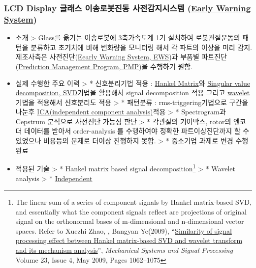 \documentclass[]{article}
\begin{document}
\subsubsection{LCD Display 글래스 이송로봇진동 사전감지시스템 (\href{https://en.wikipedia.org/wiki/Early_warning_system}{Early Warning System})}

\begin{itemize}
\item
  소개 \textgreater{} Glass를 옮기는 이송로봇에 3축가속도계 1기 설치하여
  로봇관절운동의 패턴을 분류하고 초기치에 비해 변화량을 모니터링 해서 각
  파트의 이상을 미리 감지. 제조사측은
  사전진단(\href{https://en.wikipedia.org/wiki/Early_warning_system}{Eearly
  Warning System, EWS})과 부품별
  파트진단(\href{https://en.wikipedia.org/wiki/Predictive_maintenance}{Prediction
  Management Program, PMP})을 수행하기 원함.
\item
  실제 수행한 주요 이력 \textgreater{} * 신호분리기법 적용 :
  \href{https://en.wikipedia.org/wiki/Hankel_matrix}{Hankel Matrix}와
  \href{https://en.wikipedia.org/wiki/Singular_value_decomposition}{Singular
  value decomposition, SVD}기법을 활용해서 signal decomposition 적용
  그리고 \href{https://en.wikipedia.org/wiki/Wavelet}{wavelet} 기법을
  적용해서 신호분리도 적용 \textgreater{} * 패턴분류 :
  rms-triggering기법으로 구간을 나눈후
  \href{https://en.wikipedia.org/wiki/Independent_component_analysis}{ICA(independent
  component analysis)}적용 \textgreater{} * Spectrogram과 Cepstrum
  분석으로 사전진단 가능성 판단 \textgreater{} * 각관절의 기어박스,
  rotor의 엔코더 데이터를 받아서 order-analysis 를 수행하여야 정확한
  파트이상진단까지 할 수 있었으나 비용등의 문제로 더이상 진행하지 못함.
  \textgreater{} * 중소기업 과제로 변경 수행완료
\item
  적용된 기술 \textgreater{} * Hankel matrix based signal
  decomposition\footnote{The linear sum of a series of component signals
    by Hankel matrix-based SVD, and essentially what the component
    signals reflect are projections of original signal on the
    orthonormal bases of m-dimensional and n-dimensional vector spaces.
    Refer to Xuezhi Zhao, , Bangyan Ye(2009),
    ``\href{http://www.sciencedirect.com/science/article/pii/S0888327008002604}{Similarity
    of signal processing effect between Hankel matrix-based SVD and
    wavelet transform and its mechanism analysis}'', \emph{Mechanical
    Systems and Signal Processing} Volume 23, Issue 4, May 2009, Pages
    1062--1075} \textgreater{} * Wavelet analysis \textgreater{} *
  \href{https://en.wikipedia.org/wiki/Independent_component_analysis}{Independent
}
\end{itemize}
\end{document}
